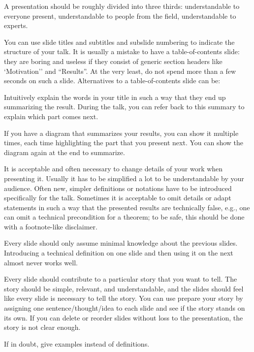 \documentclass[12pt]{article}
\begin{document}
A presentation should be roughly divided into three thirds: understandable to everyone present, understandable to people from the field, understandable to experts.
\medskip

You can use slide titles and subtitles and subslide numbering to indicate the structure of your talk.
It is usually a mistake to have a table-of-contents slide: they are boring and useless if they consist of generic section headers like `Motivation'' and ``Results''.
At the very least, do not spend more than a few seconds on such a slide.
Alternatives to a table-of-contents slide can be:
\begin{compactitem}
\item Intuitively explain the words in your title in such a way that they end up summarizing the result.
During the talk, you can refer back to this summary to explain which part comes next.
\item If you have a diagram that summarizes your results, you can show it multiple times, each time highlighting the part that you present next.
You can show the diagram again at the end to summarize.
\end{compactitem}
\medskip

It is acceptable and often necessary to change details of your work when presenting it.
Usually it has to be simplified a lot to be understandable by your audience.
Often new, simpler definitions or notations have to be introduced specifically for the talk.
Sometimes it is acceptable to omit details or adapt statements in such a way that the presented results are technically false, e.g., one can omit a technical precondition for a theorem; to be safe, this should be done with a footnote-like disclaimer.
\medskip

Every slide should only assume minimal knowledge about the previous slides.
Introducing a technical definition on one slide and then using it on the next almost never works well.
\medskip

Every slide should contribute to a particular story that you want to tell.
The story should be simple, relevant, and understandable, and the slides should feel like every slide is necessary to tell the story.
You can use prepare your story by assigning one sentence/thought/idea to each slide and see if the story stands on its own.
If you can delete or reorder slides without loss to the presentation, the story is not clear enough.
\medskip

If in doubt, give examples instead of definitions.
\medskip
\end{document}
